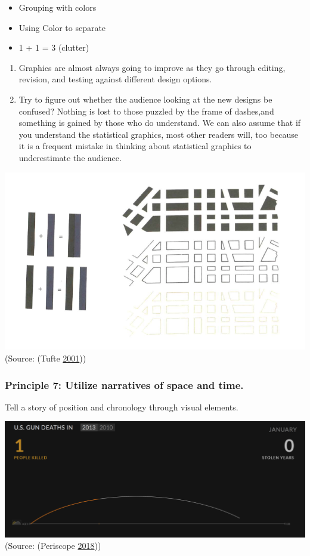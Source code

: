 \documentclass[]{book}
\providecommand{\tightlist}{%
  \setlength{\itemsep}{0pt}\setlength{\parskip}{0pt}}
\theoremstyle{definition}
\theoremstyle{definition}
\theoremstyle{definition}
\theoremstyle{remark}
\begin{document}
\begin{itemize}
\tightlist
\item
  Grouping with colors
\item
  Using Color to separate
\item
  1 + 1 = 3 (clutter)
\end{itemize}

\begin{enumerate}
\def\labelenumi{\arabic{enumi}.}
\setcounter{enumi}{1}
\item
  Graphics are almost always going to improve as they go through
  editing, revision, and testing against different design options.
\item
  Try to figure out whether the audience looking at the new designs be
  confused? Nothing is lost to those puzzled by the frame of dashes,and
  something is gained by those who do understand. We can also assume
  that if you understand the statistical graphics, most other readers
  will, too because it is a frequent mistake in thinking about
  statistical graphics to underestimate the audience.
\end{enumerate}

\includegraphics{images/Tufte_figure10.png} (Source: (Tufte
\protect\hyperlink{ref-Tufte_2001}{2001}))

\subsubsection{Principle 7: Utilize narratives of space and
time.}\label{principle-7-utilize-narratives-of-space-and-time.}

Tell a story of position and chronology through visual elements.

\includegraphics{images/Tufte_figure11.png} (Source: (Periscope
\protect\hyperlink{ref-narratives_2017}{2018}))
\end{document}
